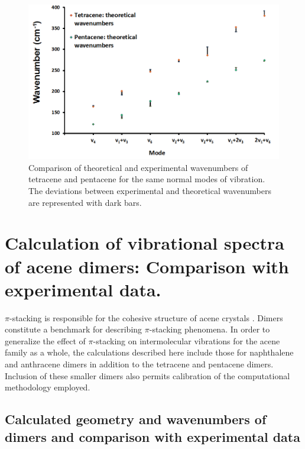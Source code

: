 \begin{figure}[H]
	\centering
	\includegraphics[scale=0.6]{image/comparison}
	\caption[Comparison of theoretical and experimental wavenumbers of tetracene and pentacene]{Comparison of theoretical and experimental wavenumbers of tetracene and pentacene for the same normal modes of vibration. The deviations between experimental and theoretical wavenumbers are represented with dark bars.} \label{figure4}
\end{figure}

\section{Calculation of vibrational spectra of acene dimers: Comparison with experimental data.}

$\pi$-stacking is responsible for the cohesive structure of acene crystals \cite{campbell1962crystal,mattheus2001polymorphism,brock1982temperature,facelli1993determination,brock1990temperature}. Dimers constitute a benchmark for describing $\pi$-stacking phenomena. In order to generalize the effect of $\pi$-stacking on intermolecular vibrations for the acene family as a whole, the calculations described here include those for naphthalene and anthracene dimers in addition to the tetracene and pentacene dimers. Inclusion of these smaller dimers also permits calibration of the computational methodology employed.  

\subsection{Calculated geometry and wavenumbers of dimers and comparison with experimental data}

